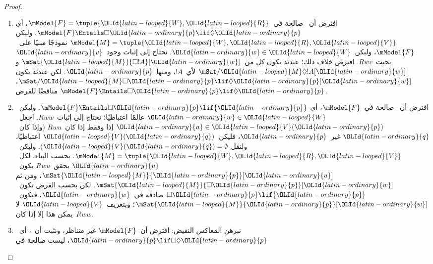 \documentclass[../../../include/open-logic-section]{subfiles}
\begin{document}
\begin{proof}
  \begin{enumerate}
  \item افترض أن~ صالحة في~$\mModel{F} = \tuple{{\OLId{latin-looped}{W}}, {\OLId{latin-looped}{R}}}$، أي
    $\mModel{F} \Entails \Box {\OLId{latin-ordinary}{p}} \lif \Diamond {\OLId{latin-ordinary}{p}}$. وليكن
    $\mModel{M} = \tuple{{\OLId{latin-looped}{W}}, {\OLId{latin-looped}{R}}, {\OLId{latin-looped}{V}}}$ نموذجًا مبنيًا على~$\mModel{F}$،
    وليكن~${\OLId{latin-ordinary}{w}} \in {\OLId{latin-looped}{W}}$. نحتاج إلى إثبات وجود~${\OLId{latin-ordinary}{v}}$ بحيث~$Rwv$. افترض خلاف
    ذلك؛ عندئذ يكون كل من~$\mSat{{\OLId{latin-looped}{M}}}{\Box !A}[{\OLId{latin-ordinary}{w}}]$ و
    $\mSat/{{\OLId{latin-looped}{M}}}{\Diamond !A}[{\OLId{latin-ordinary}{w}}]$ لأي~$!A$، ومنها~${\OLId{latin-ordinary}{p}}$. لكن عندئذ يكون
    $\mSat/{{\OLId{latin-looped}{M}}}{\Box {\OLId{latin-ordinary}{p}} \lif \Diamond {\OLId{latin-ordinary}{p}}}[{\OLId{latin-ordinary}{w}}]$، مناقضًا للفرض
    $\mModel{F} \Entails \Box {\OLId{latin-ordinary}{p}} \lif \Diamond {\OLId{latin-ordinary}{p}}$.
  \item افترض أن~ صالحة في~$\mModel{F}$، أي
    $\mModel{F} \Entails \Box {\OLId{latin-ordinary}{p}} \lif {\OLId{latin-ordinary}{p}}$. وليكن~${\OLId{latin-ordinary}{w}} \in {\OLId{latin-looped}{W}}$ عالمًا
    اعتباطيًا؛ نحتاج إلى إثبات~$Rww$. اجعل~${\OLId{latin-ordinary}{u}} \in {\OLId{latin-looped}{V}}({\OLId{latin-ordinary}{p}})$ إذا وفقط إذا
    كان~$Rwu$ (وإذا كان~${\OLId{latin-ordinary}{q}}$ غير~${\OLId{latin-ordinary}{p}}$، فليكن~${\OLId{latin-looped}{V}}({\OLId{latin-ordinary}{q}})$ اعتباطيًا، ولنقل
    ${\OLId{latin-looped}{V}}({\OLId{latin-ordinary}{q}}) = \emptyset$). وليكن~$\mModel{M} = \tuple{{\OLId{latin-looped}{W}}, {\OLId{latin-looped}{R}}, {\OLId{latin-looped}{V}}}$. بحسب
    البناء، لكل~${\OLId{latin-ordinary}{u}}$ يحقق~$Rwu$ يكون~$\mSat{{\OLId{latin-looped}{M}}}{{\OLId{latin-ordinary}{p}}}[{\OLId{latin-ordinary}{u}}]$، ومن ثم
    $\mSat{{\OLId{latin-looped}{M}}}{\Box {\OLId{latin-ordinary}{p}}}[{\OLId{latin-ordinary}{w}}]$. لكن بحسب الفرض تكون~$\Box {\OLId{latin-ordinary}{p}} \lif {\OLId{latin-ordinary}{p}}$ صادقة
    في~${\OLId{latin-ordinary}{w}}$، فيكون~$\mSat{{\OLId{latin-looped}{M}}}{{\OLId{latin-ordinary}{p}}}[{\OLId{latin-ordinary}{w}}]$؛ وبتعريف~${\OLId{latin-looped}{V}}$ لا يمكن هذا إلا إذا
    كان~$Rww$.
  \item نبرهن المعاكس النقيض: افترض أن~$\mModel{F}$ غير متناظر، ونثبت
    أن~، أي~${\OLId{latin-ordinary}{p}} \lif \Box\Diamond {\OLId{latin-ordinary}{p}}$، ليست صالحة في

\end{enumerate}
\end{proof}
\end{document}
